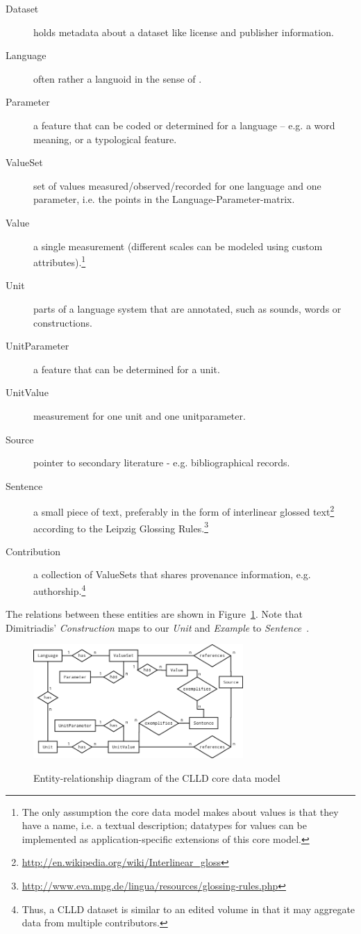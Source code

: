 \documentclass[a4paper,10pt]{article}
\begin{document}
\begin{description}
\item[Dataset] holds metadata about a dataset like license and publisher information.
\item[Language] often rather a languoid in the sense of .
\item[Parameter] a feature that can be coded or determined for a language
-- e.g. a word meaning, or a typological feature.
\item[ValueSet] set of values measured/observed/recorded for one language and one parameter,
i.e. the points in the Language-Parameter-matrix.
\item[Value] a single measurement (different scales can be modeled using custom attributes).\footnote{The only assumption
the core data model makes about values is that they have a name, i.e. a textual description;
datatypes for values can be implemented as application-specific extensions of this core model.}
\item[Unit] parts of a language system that are annotated, such as sounds, words or constructions.
\item[UnitParameter] a feature that can be determined for a unit.
\item[UnitValue] measurement for one unit and one unitparameter.
\item[Source] pointer to secondary literature - e.g. bibliographical records.
\item[Sentence] a small piece of text, preferably in the form of interlinear glossed
text\footnote{\url{http://en.wikipedia.org/wiki/Interlinear\_gloss}} according to the
Leipzig Glossing Rules.\footnote{\url{http://www.eva.mpg.de/lingua/resources/glossing-rules.php}}
\item[Contribution] a collection of ValueSets that shares provenance information, e.g. authorship.\footnote{Thus,
a CLLD dataset is similar to an edited volume in that it may aggregate data from multiple contributors.}
\end{description}

The relations between these entities are shown in Figure~\ref{cllddatamodel}. Note that
Dimitriadis' \emph{Construction} maps to our \emph{Unit} and \emph{Example} to \emph{Sentence}~\cite[p.~15]{burs}.

\begin{figure}[h!]
  \caption{Entity-relationship diagram of the CLLD core data model}
  \centering
\includegraphics[width=8cm]{clld_erd.png}
\label{cllddatamodel}
\end{figure}
\end{document}
